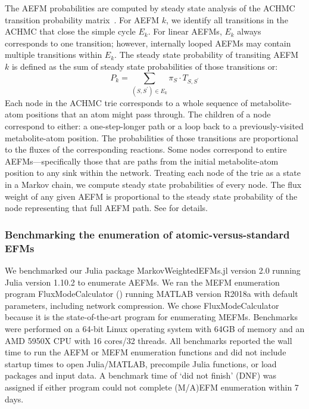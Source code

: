 \documentclass[12pt]{article}
\begin{document}
The AEFM probabilities are computed by steady state analysis of the ACHMC
transition probability matrix~\citep{ChitpinJustinG2023AMct}. For AEFM
$k$, we identify all transitions in the ACHMC that close the simple cycle
$E_k$. For linear AEFMs, $E_k$ always corresponds to one transition;
however, internally looped AEFMs may contain multiple transitions within
$E_k$. The steady state probability of transiting AEFM $k$ is defined as
the sum of steady state probabilities of those transitions or:
%
\begin{equation}
    P_k = \sum_{(S,S^\prime) \in E_k} \pi_S \cdot T_{S, S^\prime}
\end{equation}
%
Each node in the ACHMC trie corresponds to a whole sequence of
metabolite-atom positions that an atom might pass through. The children of
a node correspond to either: a one-step-longer path or a loop back to
a previously-visited metabolite-atom position. The probabilities of those
transitions are proportional to the fluxes of the corresponding reactions.
Some nodes correspond to entire AEFMs---specifically those that are paths
from the initial metabolite-atom position to any sink within the network.
Treating each node of the trie as a state in a Markov chain, we compute
steady state probabilities of every node. The flux weight of any given
AEFM is proportional to the steady state probability of the node representing
that full AEFM path. See \citeauthor{ChitpinJustinG2023AMct}
for details.

\subsubsection*{Benchmarking the enumeration of atomic-versus-standard EFMs}

We benchmarked our Julia package MarkovWeightedEFMs.jl version 2.0 running
Julia version 1.10.2 to enumerate AEFMs. We ran the MEFM
enumeration program FluxModeCalculator (\cite{vanKlinkenJanBert2016Faet})
running MATLAB version R2018a with default parameters, including network
compression. We chose FluxModeCalculator because it is the
state-of-the-art program for enumerating MEFMs. Benchmarks were
performed on a 64-bit Linux operating system with 64GB of memory and an
AMD 5950X CPU with 16 cores/32 threads. All benchmarks reported the wall
time to run the AEFM or MEFM enumeration functions and did not
include startup times to open Julia/MATLAB, precompile Julia functions, or
load packages and input data. A benchmark time of `did not finish' (DNF)
was assigned if either program could not complete (M/A)EFM enumeration
within 7 days.
\end{document}
